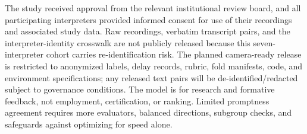 The study received approval from the relevant institutional review board, and all participating interpreters provided informed consent for use of their recordings and associated study data. Raw recordings, verbatim transcript pairs, and the interpreter-identity crosswalk are not publicly released because this seven-interpreter cohort carries re-identification risk. The planned camera-ready release is restricted to anonymized labels, delay records, rubric, fold manifests, code, and environment specifications; any released text pairs will be de-identified/redacted subject to governance conditions. The model is for research and formative feedback, not employment, certification, or ranking. Limited promptness agreement requires more evaluators, balanced directions, subgroup checks, and safeguards against optimizing for speed alone.
